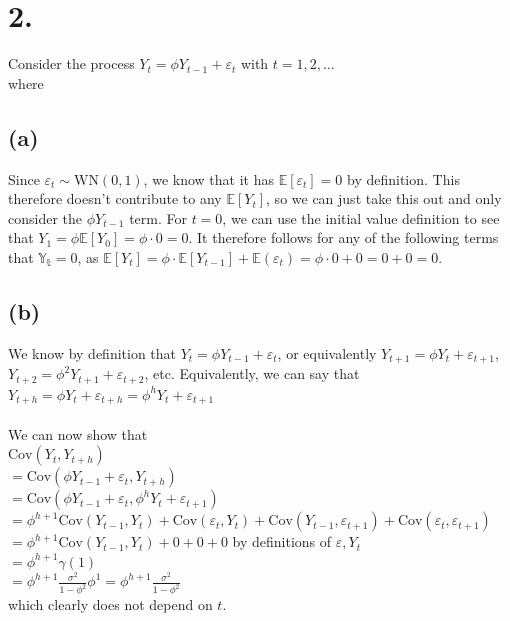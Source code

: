 \documentclass{article}
\begin{document}
\section*{2.}
{\Large

Consider the process $Y_t = \phi Y_{t-1} + \varepsilon_t$ with $t = 1, 2, \dots$ \\
where 

\subsection*{(a)}

Since $\varepsilon_t \sim \text{WN}(0,1)$, we know that it has $\mathbb{E}[\varepsilon_t] = 0$ by definition. This therefore doesn't contribute to any $\mathbb{E}[Y_t]$, so we can just take this out and only consider the $\phi Y_{t-1}$ term. For $t = 0$, we can use the initial value definition to see that $Y_1 = \phi \mathbb{E}[Y_0] = \phi \cdot 0 = 0$. It therefore follows for any of the following terms that $\mathbb{Y_t} = 0$, as $\mathbb{E}[Y_t] = \phi \cdot \mathbb{E}[Y_{t-1}] + \mathbb{E}(\varepsilon_t) = \phi \cdot 0 + 0 = 0 + 0 = 0$.

\subsection*{(b)}

We know by definition that $Y_t = \phi Y_{t-1} + \varepsilon_t$, or equivalently $Y_{t+1} = \phi Y_t + \varepsilon_{t+1}$, $Y_{t+2} = \phi^2 Y_{t+1} + \varepsilon_{t+2}$, etc. Equivalently, we can say that \\ $Y_{t+h} = \phi Y_t + \varepsilon_{t+h} = \phi^h Y_{t} + \varepsilon_{t+1}$ \\ \\
We can now show that \\
$\text{Cov}(Y_t, Y_{t+h})$ \\
$ = \text{Cov}(\phi Y_{t-1} + \varepsilon_t, Y_{t+h})$ \\
$ = \text{Cov}(\phi Y_{t-1} + \varepsilon_t, \phi^h Y_{t} + \varepsilon_{t+1})$ \\
$ = \phi^{h+1}\text{Cov}(Y_{t-1}, Y_{t}) + \text{Cov}(\varepsilon_t, Y_{t}) + \text{Cov}(Y_{t-1}, \varepsilon_{t+1}) + \text{Cov}(\varepsilon_t, \varepsilon_{t+1})$ \\
$ = \phi^{h+1}\text{Cov}(Y_{t-1}, Y_{t}) + 0 + 0 + 0$ \hfill by definitions of $\varepsilon, Y_t$ \\ 
$= \phi^{h+1} \gamma(1)$ \\
$= \phi^{h+1} \frac{\sigma^2}{1-\phi^2}\phi^1 = \phi^{h+1} \frac{\sigma^2}{1-\phi^2}$ \\ 
which clearly does not depend on $t$.

}
\end{document}
